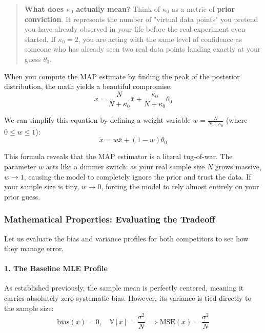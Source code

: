 \documentclass{article}
\begin{document}
\begin{quotation}
\textbf{What does $\kappa_0$ actually mean?}
Think of $\kappa_0$ as a metric of \textbf{prior conviction}. It represents the number of "virtual data points" you pretend you have already observed in your life before the real experiment even started. If $\kappa_0 = 2$, you are acting with the same level of confidence as someone who has already seen two real data points landing exactly at your guess $\theta_0$.
\end{quotation}

When you compute the MAP estimate by finding the peak of the posterior distribution, the math yields a beautiful compromise:
\begin{equation}
\tilde{x} = \frac{N}{N + \kappa_0}\bar{x} + \frac{\kappa_0}{N + \kappa_0}\theta_0
\end{equation}

We can simplify this equation by defining a weight variable $w = \frac{N}{N + \kappa_0}$ (where $0 \le w \le 1$):
\begin{equation}
\tilde{x} = w\bar{x} + (1 - w)\theta_0
\end{equation}

This formula reveals that the MAP estimator is a literal tug-of-war. The parameter $w$ acts like a dimmer switch: as your real sample size $N$ grows massive, $w \to 1$, causing the model to completely ignore the prior and trust the data. If your sample size is tiny, $w \to 0$, forcing the model to rely almost entirely on your prior guess.

\subsubsection{Mathematical Properties: Evaluating the Tradeoff}
Let us evaluate the bias and variance profiles for both competitors to see how they manage error.

\paragraph{1. The Baseline MLE Profile}
As established previously, the sample mean is perfectly centered, meaning it carries absolutely zero systematic bias. However, its variance is tied directly to the sample size:
\begin{equation}
\text{bias}(\bar{x}) = 0, \quad \mathbb{V}[\bar{x}] = \frac{\sigma^2}{N} \implies \text{MSE}(\bar{x}) = \frac{\sigma^2}{N}
\end{equation}
\end{document}

